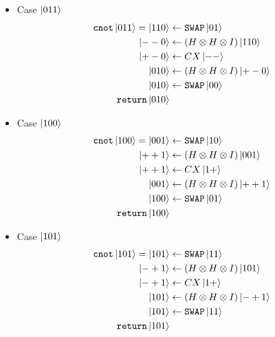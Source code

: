 \documentclass[11pt]{article}
\def\swap{\texttt{SWAP}}
\def\cnot{\texttt{cnot}}
\begin{document}
\begin{itemize}
%
\item[] Case $\ket{011}$ 
\begin{align*}
    \cnot\ket{011} = 
    \ket{110} &\leftarrow \swap\ket{01} \\
    \ket{--0} &\leftarrow (H \otimes H \otimes I)\ket{110} \\
    \ket{+-0} &\leftarrow CX\ket{--} \\
    \ket{010} &\leftarrow (H \otimes H \otimes I)\ket{+-0} \\
    \ket{010} &\leftarrow \swap\ket{00} \\
     \texttt{return} \ket{010}
\end{align*}

\item[] Case $\ket{100}$
\begin{align*}
    \cnot\ket{100} = 
    \ket{001} &\leftarrow \swap\ket{10} \\
    \ket{++1} &\leftarrow (H \otimes H \otimes I)\ket{001} \\
    \ket{++1} &\leftarrow CX\ket{1+} \\
    \ket{001} &\leftarrow (H \otimes H \otimes I)\ket{++1} \\
    \ket{100} &\leftarrow \swap\ket{01} \\
     \texttt{return} \ket{100}
\end{align*}

\item[] Case $\ket{101}$
\begin{align*}
    \cnot\ket{101} = 
    \ket{101} &\leftarrow \swap\ket{11} \\
    \ket{-+1} &\leftarrow (H \otimes H \otimes I)\ket{101} \\
    \ket{-+1} &\leftarrow CX\ket{1+} \\
    \ket{101} &\leftarrow (H \otimes H \otimes I)\ket{-+1} \\
    \ket{101} &\leftarrow \swap\ket{11} \\
     \texttt{return} \ket{101}
\end{align*}


\end{itemize}
\end{document}

